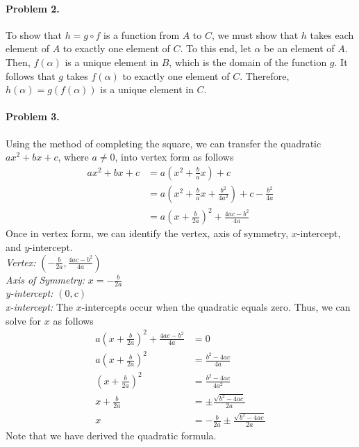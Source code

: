 \documentclass{article}
\begin{document}
\paragraph*{Problem 2.} To show that $h=g\circ f$ is a function from  $A$ to $C$, we must show that $h$ takes each element of $A$ to exactly one element of $C$. To this end, let $\alpha$ be an element of $A$. Then, $f(\alpha)$ is a unique element in $B$, which is the domain of the function $g$. It follows that $g$ takes $f(\alpha)$ to exactly one element of $C$. Therefore, $h(\alpha)=g(f(\alpha))$ is a unique element in $C$. 

\paragraph*{Problem 3.} Using the method of completing the square, we can transfer the quadratic $ax^{2}+bx+c$, where $a\neq 0$, into vertex form as follows
\begin{align*}
ax^{2}+bx+c&=a\left(x^{2}+\frac{b}{a}x\right)+c \\
&=a\left(x^{2}+\frac{b}{a}x+\frac{b^{2}}{4a^{2}}\right)+c-\frac{b^{2}}{4a} \\
&=a\left(x+\frac{b}{2a}\right)^{2}+\frac{4ac-b^{2}}{4a}
\end{align*}
Once in vertex form, we can identify the vertex, axis of symmetry, $x$-intercept, and $y$-intercept.\\
\emph{Vertex:}	$(-\frac{b}{2a},\frac{4ac-b^{2}}{4a})$\\
\emph{Axis of Symmetry:}	$x=-\frac{b}{2a}$\\
\emph{y-intercept:} $(0,c)$ \\
\emph{x-intercept:}	The $x$-intercepts occur when the quadratic equals zero. Thus, we can solve for $x$ as follows
\begin{align*}
a\left(x+\frac{b}{2a}\right)^{2}+\frac{4ac-b^{2}}{4a}&=0 \\
a\left(x+\frac{b}{2a}\right)^{2}&=\frac{b^{2}-4ac}{4a} \\
\left(x+\frac{b}{2a}\right)^{2}&=\frac{b^{2}-4ac}{4a^{2}} \\
x+\frac{b}{2a}&=\pm\frac{\sqrt{b^{2}-4ac}}{2a} \\
x&=-\frac{b}{2a}\pm\frac{\sqrt{b^{2}-4ac}}{2a}
\end{align*}
Note that we have derived the quadratic formula.
\end{document}
